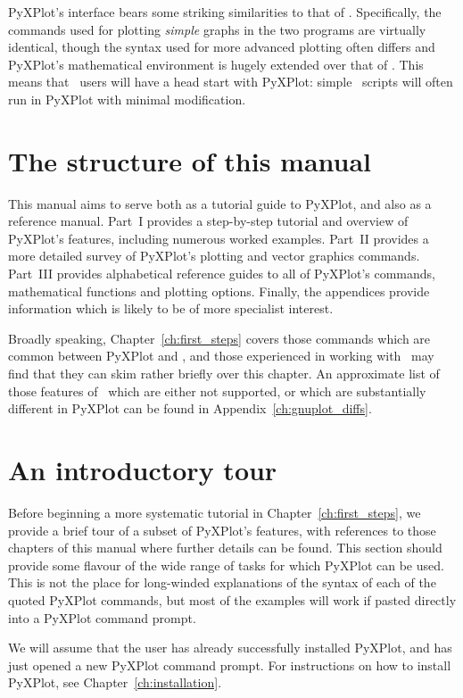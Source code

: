PyXPlot's interface bears some striking similarities to that of \gnuplot.
Specifically, the commands used for plotting {\it simple} graphs in the two
programs are virtually identical, though the syntax used for more advanced
plotting often differs and PyXPlot's mathematical environment is hugely
extended over that of \gnuplot. This means that \gnuplot\ users will have a
head start with PyXPlot: simple \gnuplot\ scripts will often run in PyXPlot
with minimal modification.

\section{The structure of this manual}

This manual aims to serve both as a tutorial guide to PyXPlot, and also as a
reference manual. Part~I provides a step-by-step tutorial and overview of
PyXPlot's features, including numerous worked examples. Part~II provides a more
detailed survey of PyXPlot's plotting and vector graphics commands. Part~III
provides alphabetical reference guides to all of PyXPlot's commands,
mathematical functions and plotting options.  Finally, the appendices provide
information which is likely to be of more specialist interest.

Broadly speaking, Chapter~\ref{ch:first_steps} covers those commands which are
common between PyXPlot and \gnuplot, and those experienced in working with
\gnuplot\ may find that they can skim rather briefly over this chapter. An
approximate list of those features of \gnuplot\ which are either not supported,
or which are substantially different in PyXPlot can be found in
Appendix~\ref{ch:gnuplot_diffs}.

\section{An introductory tour}

Before beginning a more systematic tutorial in Chapter~\ref{ch:first_steps}, we
provide a brief tour of a subset of PyXPlot's features, with references to
those chapters of this manual where further details can be found. This section
should provide some flavour of the wide range of tasks for which PyXPlot can be
used. This is not the place for long-winded explanations of the syntax of each
of the quoted PyXPlot commands, but most of the examples will work if pasted
directly into a PyXPlot command prompt.

We will assume that the user has already successfully installed PyXPlot, and
has just opened a new PyXPlot command prompt. For instructions on how to
install PyXPlot, see Chapter~\ref{ch:installation}.

